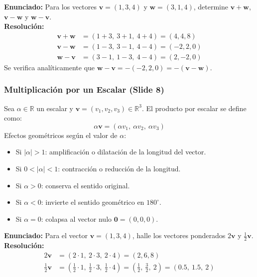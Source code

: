 \documentclass[10pt,letterpaper]{article}
\newcommand{\vv}{\mathbf{v}}
\newcommand{\vw}{\mathbf{w}}
\begin{document}
\begin{cajaEjemplo}
\textbf{Enunciado:} Para los vectores $\vv = (1, 3, 4)$ y $\vw = (3, 1, 4)$, determine $\vv + \vw$, $\vv - \vw$ y $\vw - \vv$.\\[0.15cm]
\textbf{Resolución:}
\begin{align*}
\vv + \vw &= (1 + 3,\ 3 + 1,\ 4 + 4) = (4, 4, 8) \\
\vv - \vw &= (1 - 3,\ 3 - 1,\ 4 - 4) = (-2, 2, 0) \\
\vw - \vv &= (3 - 1,\ 1 - 3,\ 4 - 4) = (2, -2, 0)
\end{align*}
Se verifica analíticamente que $\vw - \vv = -(-2, 2, 0) = -(\vv - \vw)$.
\end{cajaEjemplo}

\subsubsection{Multiplicación por un Escalar (Slide 8)}
Sea $\alpha \in \mathbb{R}$ un escalar y $\vv = (v_1, v_2, v_3) \in \mathbb{R}^3$. El producto por escalar se define como:
\[
\alpha\vv = (\alpha v_1,\ \alpha v_2,\ \alpha v_3)
\]
Efectos geométricos según el valor de $\alpha$:
\begin{itemize}
    \item Si $|\alpha| > 1$: amplificación o dilatación de la longitud del vector.
    \item Si $0 < |\alpha| < 1$: contracción o reducción de la longitud.
    \item Si $\alpha > 0$: conserva el sentido original.
    \item Si $\alpha < 0$: invierte el sentido geométrico en $180^\circ$.
    \item Si $\alpha = 0$: colapsa al vector nulo $\mathbf{0} = (0, 0, 0)$.
\end{itemize}

\begin{cajaEjemplo}
\textbf{Enunciado:} Para el vector $\vv = (1, 3, 4)$, halle los vectores ponderados $2\vv$ y $\frac{1}{2}\vv$.\\[0.15cm]
\textbf{Resolución:}
\begin{align*}
2\vv &= (2 \cdot 1,\ 2 \cdot 3,\ 2 \cdot 4) = (2, 6, 8) \\
\frac{1}{2}\vv &= \left(\frac{1}{2} \cdot 1,\ \frac{1}{2} \cdot 3,\ \frac{1}{2} \cdot 4\right) = \left(\frac{1}{2},\ \frac{3}{2},\ 2\right) = (0.5,\ 1.5,\ 2)
\end{align*}
\end{cajaEjemplo}
\end{document}
